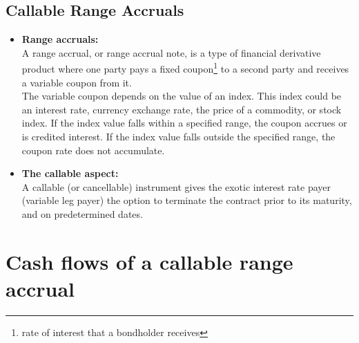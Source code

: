 \documentclass[12pt]{article}
\begin{document}
		\subsection{Callable Range Accruals}
			\begin{itemize}
				\item {\small \bf Range accruals:}\\
				A range accrual, or range accrual note, is a type of financial derivative product where one party pays a fixed coupon\footnote{rate of interest that a bondholder receives} to a second party and receives a variable coupon from it.\\
				The variable coupon depends on the value of an index. This index could be an interest rate, currency exchange rate, the price of a commodity, or stock index. If the index value falls within a specified range, the coupon accrues or is credited interest. If the index value falls outside the specified range, the coupon rate does not accumulate.
				\\
				\item {\small \bf The callable aspect:}\\
				A callable (or cancellable) instrument gives the exotic interest rate payer (variable leg payer) the option to terminate the contract prior to its maturity, and on predetermined dates.
			\end{itemize}
			\section{Cash flows of a callable range accrual}
				
\end{document}
